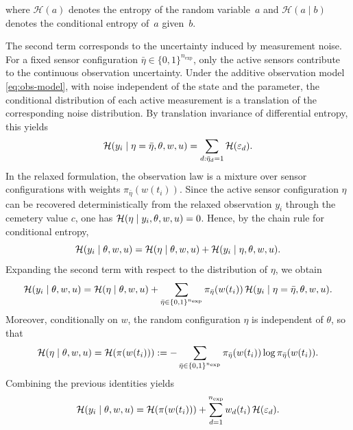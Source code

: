 \documentclass[a4paper,11pt]{article}
\begin{document}
where $\mathcal{H}(a)$ denotes the entropy of the random
variable~$a$ and $\mathcal{H}(a \mid b)$ denotes the conditional entropy
of~$a$ given~$b$.

The second term corresponds to the uncertainty induced by measurement noise. For a fixed sensor configuration
\(\bar\eta \in \{0,1\}^{n_{\mathrm{exp}}}\), only the active sensors contribute to the continuous observation uncertainty. Under the additive observation model \eqref{eq:obs-model}, with noise independent of the state and the parameter, the conditional distribution of each active measurement is a translation of the corresponding noise distribution. By translation invariance of differential entropy, this yields
\begin{equation}
{\cal H}(y_i \mid \eta=\bar\eta, \theta, w, u)
=
\sum_{d:\bar\eta_d = 1} {\cal H}(\varepsilon_d).
\end{equation}
In the relaxed formulation, the observation law is a mixture over sensor configurations with weights
\(\pi_{\bar\eta}(w(t_i))\). Since the active sensor configuration \(\eta\) can be recovered deterministically from the relaxed observation \(y_i\) through the cemetery value \(c\), one has
\(
{\cal H}(\eta \mid y_i,\theta,w,u)=0
\).
Hence, by the chain rule for conditional entropy,
\begin{equation}
{\cal H}(y_i \mid \theta,w,u)
=
{\cal H}(\eta \mid \theta,w,u)
+
{\cal H}(y_i \mid \eta,\theta,w,u).
\end{equation}
Expanding the second term with respect to the distribution of \(\eta\), we obtain
\begin{equation}
{\cal H}(y_i \mid \theta,w,u)
=
{\cal H}(\eta \mid \theta,w,u)
+
\sum_{\bar\eta\in\{0,1\}^{n_{\mathrm{exp}}}}
\pi_{\bar\eta}(w(t_i))\,{\cal H}(y_i \mid \eta=\bar\eta,\theta,w,u).
\end{equation}
Moreover, conditionally on \(w\), the random configuration \(\eta\) is independent of \(\theta\), so that
\begin{equation}
{\cal H}(\eta \mid \theta, w, u)
=
{\cal H}(\pi(w(t_i)))
:=
-
\sum_{\bar\eta \in \{0,1\}^{n_{\mathrm{exp}}}}
\pi_{\bar\eta}(w(t_i)) \log \pi_{\bar\eta}(w(t_i)).
\end{equation}
Combining the previous identities yields
\begin{equation} \label{eq:entropy_measure}
{\cal H}(y_i \mid \theta, w, u)
=
{\cal H}(\pi(w(t_i)))
+
\sum_{d=1}^{n_{\mathrm{exp}}} w_d(t_i)\, {\cal H}(\varepsilon_d).
\end{equation}
\end{document}
